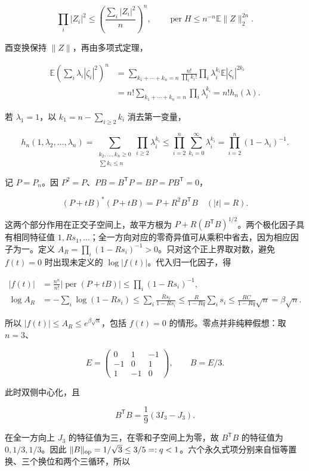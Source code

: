 \documentclass[11pt,a4paper]{article}
\begin{document}
\[\prod_i|Z_i|^2\le\left(\frac{\sum_i|Z_i|^2}{n}\right)^n,
\qquad \operatorname{per}H\le n^{-n}\mathbb E\|Z\|_2^{2n}.\]

酉变换保持 \(\|Z\|\)，再由多项式定理，

\[\begin{aligned}
\mathbb E\left(\sum_i\lambda_i|\zeta_i|^2\right)^n
&=\sum_{k_1+\cdots+k_n=n}\frac{n!}{\prod_i k_i!}
\prod_i\lambda_i^{k_i}\mathbb E|\zeta_i|^{2k_i}\\
&=n!\sum_{k_1+\cdots+k_n=n}\prod_i\lambda_i^{k_i}
=n!h_n(\lambda).
\end{aligned}\]

若 \(\lambda_1=1\)，以 \(k_1=n-\sum_{i\ge2}k_i\) 消去第一变量，

\[h_n(1,\lambda_2,\ldots,\lambda_n)
=\sum_{\substack{k_2,\ldots,k_n\ge0\\\sum k_i\le n}}\prod_{i\ge2}\lambda_i^{k_i}
\le\prod_{i=2}^n\sum_{k_i=0}^{\infty}\lambda_i^{k_i}
=\prod_{i=2}^n(1-\lambda_i)^{-1}.\]

记 \(P=P_n\)。因 \(P^2=P\)、\(PB=B^{\mathsf T}P=BP=PB^{\mathsf T}=0\)，

\[(P+tB)^*(P+tB)=P+R^2B^{\mathsf T}B
\quad(|t|=R).\]

这两个部分作用在正交子空间上，故平方根为 \(P+R(B^{\mathsf T}B)^{1/2}\)。两个极化因子具有相同特征值 \(1,Rs_1,\ldots\)；全一方向对应的零奇异值可从乘积中省去，因为相应因子为一。定义 \(A_R=\prod_i(1-Rs_i)^{-1}>0\)。只对这个正上界取对数，避免 \(f(t)=0\) 时出现未定义的 \(\log|f(t)|\)。代入归一化因子，得

\[\begin{aligned}
|f(t)|&=\frac{n^n}{n!}|\operatorname{per}(P+tB)|
\le\prod_i(1-Rs_i)^{-1},\\
\log A_R&=-\sum_i\log(1-Rs_i)\le\sum_i\frac{Rs_i}{1-Rs_i}
\le\frac R{1-Rq}\sum_i s_i
\le\frac{RC}{1-Rq}\sqrt n=\beta\sqrt n.
\end{aligned}\]

所以 \(|f(t)|\le A_R\le e^{\beta\sqrt n}\)，包括 \(f(t)=0\) 的情形。零点并非纯粹假想：取 \(n=3\)、

\[E=\begin{pmatrix}0&1&-1\\-1&0&1\\1&-1&0\end{pmatrix},\qquad B=E/3.\]

此时双侧中心化，且

\[B^{\mathsf T}B=\frac19(3I_3-J_3).\]

在全一方向上 \(J_3\) 的特征值为三，在零和子空间上为零，故 \(B^{\mathsf T}B\) 的特征值为 \(0,1/3,1/3\)。因此 \(\|B\|_{\rm op}=1/\sqrt3\le3/5=:q<1\)。六个永久式项分别来自恒等置换、三个换位和两个三循环，所以
\end{document}
